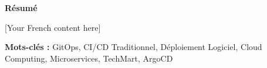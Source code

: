 \thispagestyle{empty}
\vspace*{\fill}

\begin{center}
{\Large \textbf{Résumé}}
\end{center}

\vspace{1cm}

[Your French content here]

\textbf{Mots-clés :} GitOps, CI/CD Traditionnel, Déploiement Logiciel, Cloud Computing, Microservices, TechMart, ArgoCD

\vspace*{\fill}
\newpage